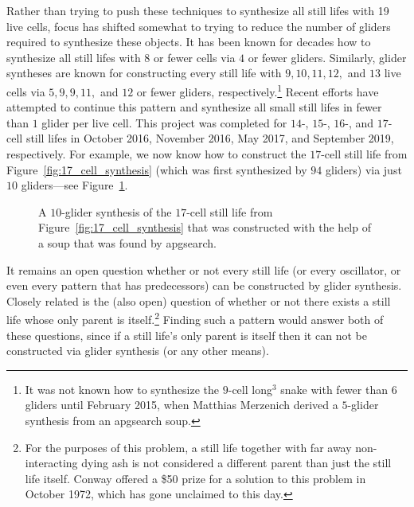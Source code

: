 Rather than trying to push these techniques to synthesize all still lifes with 19 live cells, focus has shifted somewhat to trying to reduce the number of gliders required to synthesize these objects. It has been known for decades how to synthesize all still lifes with $8$ or fewer cells via $4$ or fewer gliders. Similarly, glider syntheses are known for constructing every still life with $9, 10, 11, 12,$ and $13$ live cells via $5, 9, 9, 11,$ and $12$ or fewer gliders, respectively.\footnote{It was not known how to synthesize the $9$-cell long$^3$ snake with fewer than $6$ gliders until February 2015, when Matthias Merzenich derived a $5$-glider synthesis from an apgsearch soup.} Recent efforts have attempted to continue this pattern and synthesize all small still lifes in fewer than $1$ glider per live cell. This project was completed for $14$-, $15$-, $16$-, and $17$-cell still lifes in October 2016, November 2016, May 2017, and September 2019, respectively. For example, we now know how to construct the $17$-cell still life from Figure~\ref{fig:17_cell_synthesis} (which was first synthesized by $94$ gliders) via just $10$ gliders---see Figure~\ref{fig:17_cell_synthesis_small}.

\begin{figure}[!htb]
	\centering
	\caption{A $10$-glider synthesis of the $17$-cell still life from Figure~\ref{fig:17_cell_synthesis} that was constructed with the help of a soup that was found by apgsearch.}\label{fig:17_cell_synthesis_small}
\end{figure}

It remains an open question whether or not every still life (or every oscillator, or even every pattern that has predecessors) can be constructed by glider synthesis. Closely related is the (also open) question of whether or not there exists a still life whose only parent is itself.\footnote{For the purposes of this problem, a still life together with far away non-interacting dying ash is not considered a different parent than just the still life itself. Conway offered a \$50 prize for a solution to this problem in October 1972, which has gone unclaimed to this day.} Finding such a pattern would answer both of these questions, since if a still life's only parent is itself then it can not be constructed via glider synthesis (or any other means).

